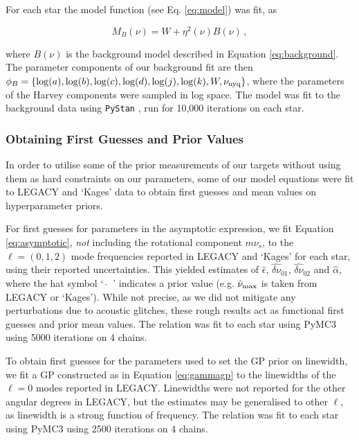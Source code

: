 \documentclass[12pt]{article}
\begin{document}
For each star the model function (see Eq. \ref{eq:model}) was fit, as

\begin{equation}
	M_{B}(\nu) = W + \eta^2(\nu)B(\nu)\, ,
\end{equation}

\noindent where $B(\nu)$ is the background model described in Equation \ref{eq:background}. The parameter components of our background fit are then $\phi_B = \{\log(a), \log(b), \log(c), \log(d), \log(j), \log(k), W, \nu_{\rm nyq}\}$, where the parameters of the Harvey components were sampled in log space. The model was fit to the background data using \texttt{PyStan} \cite{vanhoey+2013}, run for 10,000 iterations on each star. 

\subsubsection{Obtaining First Guesses and Prior Values}
In order to utilise some of the prior measurements of our targets without using them as hard constraints on our parameters, some of our model equations were fit to LEGACY and `Kages' data to obtain first guesses and mean values on hyperparameter priors.

For first guesses for parameters in the asymptotic expression, we fit Equation \ref{eq:asymptotic}, \textit{not} including the rotational component $m\nu_s$, to the $\ell = (0, 1, 2)$ mode frequencies reported in LEGACY and `Kages' for each star, using their reported uncertainties. This yielded estimates of $\hat{\epsilon}$, $\widehat{\delta\nu}_{01}$, $\widehat{\delta\nu}_{02}$ and $\hat{\alpha}$, where the hat symbol `\, $\widehat{}$\, ' indicates a prior value (e.g. $\hat{\nu}_{\rm max}$ is taken from LEGACY or `Kages'). While not precise, as we did not mitigate any perturbations due to acoustic glitches, these rough results act as functional first guesses and prior mean values. The relation was fit to each star using PyMC3 \cite{salvatier+2016} using 5000 iterations on 4 chains.

To obtain first guesses for the parameters used to set the GP prior on linewidth, we fit a GP constructed as in Equation \ref{eq:gammagp} to the linewidths of the $\ell = 0$ modes reported in LEGACY. Linewidths were not reported for the other angular degrees in LEGACY, but the estimates may be generalised to other $\ell$, as linewidth is a strong function of frequency.  The relation was fit to each star using PyMC3 using 2500 iterations on 4 chains.
\end{document}
